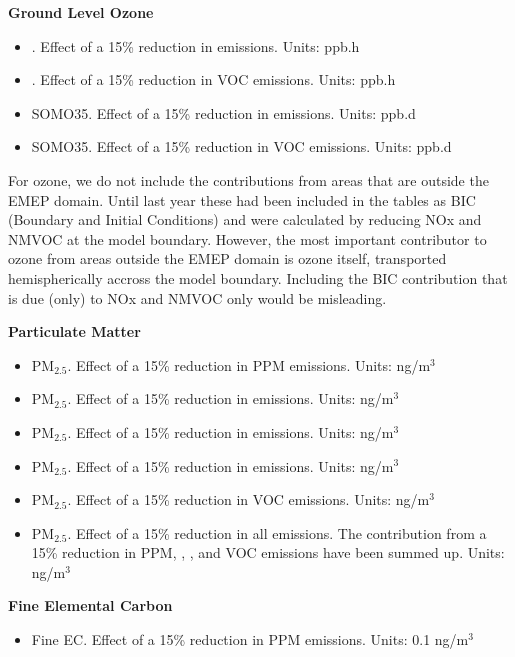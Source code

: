 \textbf{Ground Level Ozone}
\begin{itemize}
\item \aotucf. Effect of a 15\% reduction in \nox emissions. Units: ppb.h
\item \aotucf. Effect of a 15\% reduction in VOC emissions. Units: ppb.h 
\item SOMO35. Effect of a 15\% reduction in \nox emissions. Units: ppb.d 
\item SOMO35. Effect of a 15\% reduction in VOC emissions. Units: ppb.d 
\end{itemize}
For ozone, we do not include the contributions from areas that are outside the EMEP domain. Until last year these had been included in the tables as BIC (Boundary and Initial Conditions) and were calculated by reducing NOx and NMVOC at the model boundary. However, the most important contributor to ozone from areas outside the EMEP domain is ozone itself, transported hemispherically accross the model boundary. Including the BIC contribution that is due (only) to NOx and NMVOC only would be misleading.
\vspace{20pt}


\textbf{Particulate Matter}
\begin{itemize}
\item PM$_{2.5}$. Effect of a 15\% reduction in PPM emissions. Units: ng/m$^3$ 
\item PM$_{2.5}$. Effect of a 15\% reduction in \sox emissions. Units: ng/m$^3$
\item PM$_{2.5}$. Effect of a 15\% reduction in \nox emissions. Units: ng/m$^3$
\item PM$_{2.5}$. Effect of a 15\% reduction in \nhiii emissions. Units: ng/m$^3$
\item PM$_{2.5}$. Effect of a 15\% reduction in VOC emissions. Units: ng/m$^3$ 
\item PM$_{2.5}$. Effect of a 15\% reduction in all emissions. The
contribution from a 15\% reduction in PPM, \sox, \nox, \nhiii and
VOC emissions have been summed up. Units: ng/m$^3$
\end{itemize}
\vspace{20pt}

\textbf{Fine Elemental Carbon}
\begin{itemize}
\item Fine EC. Effect of a 15\% reduction in PPM emissions. Units: 0.1
  ng/m$^3$
\end{itemize}
\vspace{20pt}

